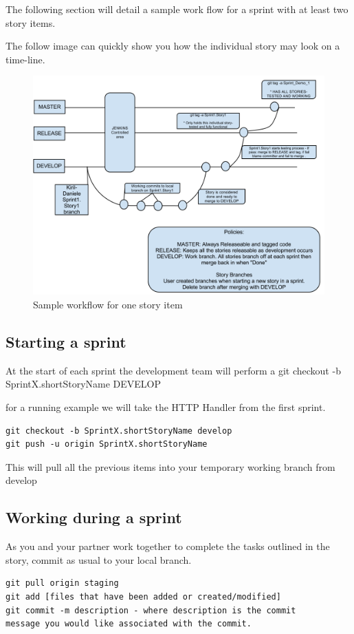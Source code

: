 The following section will detail a sample work flow for a sprint with at least two story items. 

The follow image can quickly show you how the individual story may look on a time-line.
\begin{figure}[htb]
\centering
\includegraphics[width=1\textwidth]{img/workflow}
\caption{Sample workflow for one story item}
\label{fig:architecture}
\end{figure}


\subsection{Starting a sprint}
\label{gitworkflow}
At the start of each sprint the development team will perform a git checkout -b SprintX.shortStoryName DEVELOP

for a running example we will take the HTTP Handler from the first sprint. 
\begin{verbatim}
git checkout -b SprintX.shortStoryName develop
git push -u origin SprintX.shortStoryName
\end{verbatim}
This will pull all the previous items into your temporary working branch from develop

\subsection{Working during a sprint}

As you and your partner work together to complete the tasks outlined in the story, commit as usual to your local branch.\\
\begin{verbatim}
git pull origin staging
git add [files that have been added or created/modified]
git commit -m description - where description is the commit 
message you would like associated with the commit. 
\end{verbatim}
